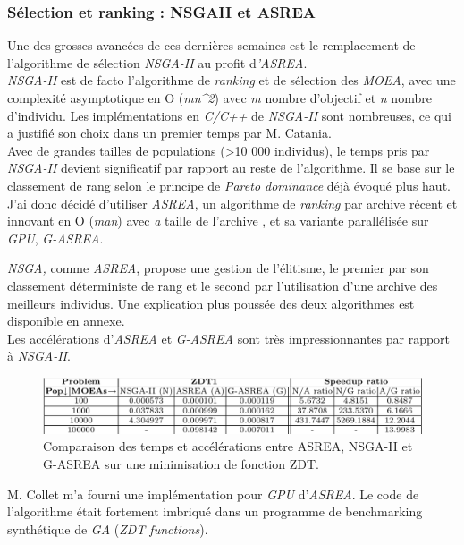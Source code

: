 \documentclass[french, 11pt]{memoir}
\begin{document}
\subsubsection{Sélection et ranking : NSGAII et
ASREA}\label{suxe9lection-et-ranking-nsgaii-et-asrea}

Une des grosses avancées de ces dernières semaines est le remplacement
de l'algorithme de sélection \emph{NSGA-II\cite{deb2002fast}} au profit d\emph{'ASREA\cite{sharma2010archived,tsutsui2013massively}}.\\
\emph{NSGA-II} est de facto l'algorithme de \emph{ranking} et de
sélection des \emph{MOEA}, avec une complexité asymptotique en O
(\emph{mn\^{}2}) avec \emph{m} nombre d'objectif et \emph{n} nombre
d'individu. Les implémentations en \emph{C/C++} de \emph{NSGA-II} sont
nombreuses, ce qui a justifié son choix dans un premier temps par M.
Catania.\\
Avec de grandes tailles de populations (\textgreater{}10 000
individus), le temps pris par \textit{NSGA-II} devient significatif par
rapport au reste de l'algorithme. Il se base sur le classement de rang
selon le principe de \textit{Pareto dominance} déjà évoqué plus haut. J'ai donc
décidé d'utiliser \textit{ASREA}, un algorithme de \textit{ranking} par archive
récent et innovant en O (\emph{man}) avec \emph{a} taille de l'archive ,
et sa variante parallélisée sur \emph{GPU}, \emph{G-ASREA\cite{sharma2010gpgpu}}.

\bigskip
\emph{NSGA,} comme \emph{ASREA}, propose une gestion de l'élitisme, le
premier par son classement déterministe de rang et le second par
l'utilisation d'une archive des meilleurs individus. Une explication
plus poussée des deux algorithmes est disponible en annexe. \\
Les accélérations d'\emph{ASREA} et \emph{G-ASREA} sont très
impressionnantes par rapport à \emph{NSGA-II}.
\begin{figure}[htbp]
	\begin{center}
		\includegraphics[width=6in]{img/asrea_table.png}
		\caption{Comparaison des temps et accélérations entre ASREA, NSGA-II et G-ASREA sur une minimisation de fonction ZDT\cite{zitzler2000comparison}.}
	\end{center}
\end{figure}
M. Collet m'a fourni une implémentation pour \textit{GPU} d'\emph{ASREA}. Le
code de l'algorithme était fortement imbriqué dans un programme de
benchmarking synthétique de \emph{GA} (\emph{ZDT functions\cite{zitzler2000comparison}}).
\end{document}

